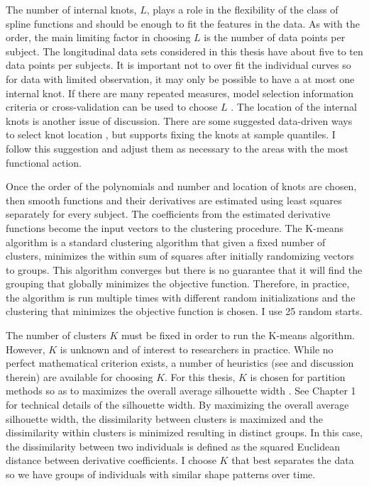 The number of internal knots, $L$, plays a role in the flexibility of the class of spline functions and should be enough to fit the features in the data. As with the order, the main limiting factor in choosing $L$ is the number of data points per subject. The longitudinal data sets considered in this thesis have about five to ten data points per subjects. It is important not to over fit the individual curves so for data with limited observation, it may only be possible to have a at most one internal knot. If there are many repeated measures, model selection information criteria or cross-validation can be used to choose $L$ \cite{rice2001}. The location of the internal knots is another issue of discussion. There are some suggested data-driven ways to select knot location \cite{shanggang2001}, but \textcite{ruppert2002} supports fixing the knots at sample quantiles. I follow this suggestion and adjust them as necessary to the areas with the most functional action. 

Once the order of the polynomials and number and location of knots are chosen, then smooth functions and their derivatives are estimated using least squares separately for every subject. The coefficients from the estimated derivative functions become the input vectors to the clustering procedure. The K-means algorithm is a standard clustering algorithm that given a fixed number of clusters, minimizes the within sum of squares after initially randomizing vectors to groups. This algorithm converges but there is no guarantee that it will find the grouping that globally minimizes the objective function. Therefore, in practice, the algorithm is run multiple times with different random initializations and the clustering that minimizes the objective function is chosen. I use 25 random starts.

The number of clusters $K$ must be fixed in order to run the K-means algorithm. However, $K$ is unknown and of interest to researchers in practice. While no perfect mathematical criterion exists, a number of heuristics (see \cite{tibshirani2001} and discussion therein) are available for choosing $K$. For this thesis, $K$ is chosen for partition methods so as to maximizes the overall average silhouette width \cite{rousseeuw1987}. See Chapter 1 for technical details of the silhouette width. By maximizing the overall average silhouette width, the dissimilarity between clusters is maximized and the dissimilarity within clusters is minimized resulting in distinct groups. In this case, the dissimilarity between two individuals is defined as the squared Euclidean distance between derivative coefficients. I choose $K$ that best separates the data so we have groups of individuals with similar shape patterns over time.


